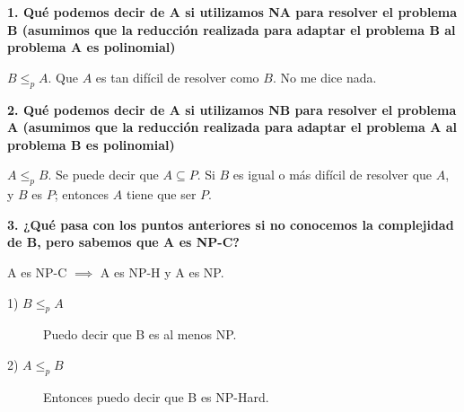 \documentclass[../tp3_grupo404.tex]{subfiles}
\begin{document}
\noindent\textbf{1. Qué podemos decir de A si utilizamos NA para resolver el problema B
(asumimos que la reducción realizada para adaptar el problema B al problema A es polinomial)}

$B \leq_p A$. Que $A$ es tan difícil de resolver como $B$. No me dice nada.

\vspace{15mm}\noindent\textbf{2. Qué podemos decir de A si utilizamos NB para resolver el problema A
(asumimos que la reducción realizada para adaptar el problema A al problema B es polinomial)}

$A \leq_p B$. Se puede decir que $A \subseteq P$.
Si $B$ es igual o más difícil de resolver que $A$, y $B$ es $P$; entonces $A$ tiene que ser $P$.

\vspace{15mm}\noindent\textbf{3. ¿Qué pasa con los puntos anteriores si no conocemos la complejidad de B,
pero sabemos que A es NP-C?}

A es NP-C $\implies$ A es NP-H y A es NP.

\begin{description}
    \item[1) $B \leq_p A$] Puedo decir que B es al menos NP.
    \item[2) $A \leq_p B$] Entonces puedo decir que B es NP-Hard.
\end{description}
\end{document}
